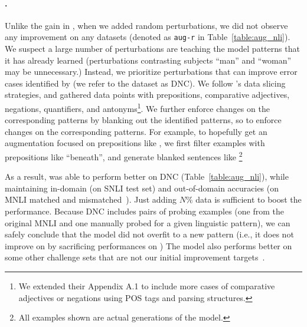 \paragraph{\nli.}
Unlike the gain in \sst, when we added random perturbations, we did not observe any improvement on any datasets (denoted as \texttt{aug-r} in Table~\ref{table:aug_nli}).
We suspect a large number of perturbations are teaching the model patterns that it has already learned (\eg perturbations contrasting subjects ``man'' and ``woman'' may be unnecessary.) 
Instead, we prioritize perturbations that can improve error cases identified by \citet{kim2019probing} (we refer to the dataset as DNC).
We follow \citet{chen2019slice}'s data slicing strategies, and gathered data points with prepositions, comparative adjectives, negations, quantifiers, and antonyms\footnote{We extended their Appendix A.1 to include more cases of \eg comparative adjectives or negations using POS tags and parsing structures.}.
We further enforce changes on the corresponding patterns by blanking out the identified patterns, so to enforce changes on the corresponding patterns.
For example, to hopefully get an augmentation focused on prepositions like , we first filter examples with prepositions like ``beneath'', and generate blanked sentences like 
\footnote{All examples shown are actual generations of the model. }

As a result, \maug was able to perform better on DNC (Table~\ref{table:aug_nli}), while maintaining in-domain (on SNLI test set) and out-of-domain accuracies (on MNLI matched and mismatched~\cite{williams-etal-2018-broad}).
Just adding $N\%$ data is sufficient to boost the performance.%
Because DNC includes pairs of probing examples (one from the original MNLI and one manually probed for a given linguistic pattern), we can safely conclude that the model did not overfit to a new pattern (i.e., it does not improve on  by sacrificing performances on )
The model also performs better on some other challenge sets that are not our initial improvement targets~\cite{naik2018stress, glockner-etal-2018-breaking, wang2018glue}.


